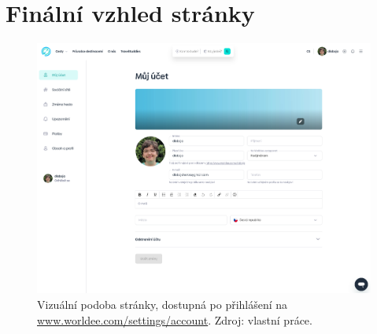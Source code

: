 \section{Finální vzhled stránky}

\begin{figure}[h!]
    \centering
    \includegraphics[width=1\linewidth]{obrazky/finalni_stranka.png}
    \caption[Vizuální podoba stránky. Zdroj: vlastní práce.]{Vizuální podoba stránky, dostupná po přihlášení na \\\href{https://www.worldee.com/cz/settings/account}{www.worldee.com/settings/account}. Zdroj: vlastní práce.}
\end{figure}